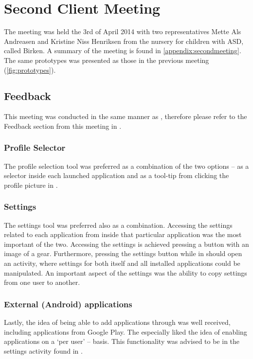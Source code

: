 \section{Second Client Meeting}\label{sec:sprint2:secondmeeting}
The meeting was held the 3rd of April 2014 with two representatives Mette Als Andreasen and Kristine Niss Henriksen from the nursery for children with ASD, called Birken.
A summary of the meeting is found in \cref{appendix:secondmeeting}.
The same prototypes was presented as those in the previous meeting (\cref{fig:prototypes}).

\subsection{Feedback}
This meeting was conducted in the same manner as , therefore please refer to the Feedback section from this meeting in .

\subsubsection{Profile Selector}
The profile selection tool was preferred as a combination of the two options -- as a selector inside each launched application and as a tool-tip from clicking the profile picture in \launcher.

\subsubsection{Settings}
The settings tool was preferred also as a combination.
Accessing the settings related to each application from inside that particular application was the most important of the two. Accessing the settings is achieved pressing a button with an image of a gear.
Furthermore, pressing the settings button while in \launcher should open an activity, where settings for both \launcher itself and all installed applications could be manipulated.
An important aspect of the settings was the ability to copy settings from one user to another.

\subsubsection{External (Android) applications}
Lastly, the idea of being able to add applications through \launcher was well received, including applications from Google Play.
The especially liked the idea of enabling applications on a `per user' -- basis.
This functionality was advised to be in the settings activity found in \launcher.

